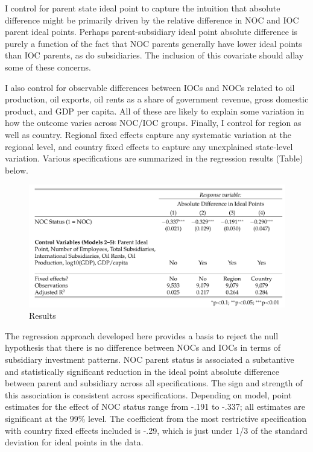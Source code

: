 \documentclass[11pt,]{book}
\begin{document}
I control for parent state ideal point to capture the intuition that absolute difference might be primarily driven by the relative difference in NOC and IOC parent ideal points. Perhaps parent-subsidiary ideal point absolute difference is purely a function of the fact that NOC parents generally have lower ideal points than IOC parents, as do subsidiaries. The inclusion of this covariate should allay some of these concerns.

I also control for observable differences between IOCs and NOCs related to oil production, oil exports, oil rents as a share of government revenue, gross domestic product, and GDP per capita. All of these are likely to explain some variation in how the outcome varies across NOC/IOC groups. Finally, I control for region as well as country. Regional fixed effects capture any systematic variation at the regional level, and country fixed effects to capture any unexplained state-level variation. Various specifications are summarized in the regression results (Table) below.

\begin{figure}

{\centering \includegraphics[width=1\linewidth]{fig/reg_results_01} 

}

\caption{Results}\label{fig:regress}
\end{figure}

The regression approach developed here provides a basis to reject the null hypothesis that there is no difference between NOCs and IOCs in terms of subsidiary investment patterns. NOC parent status is associated a substantive and statistically significant reduction in the ideal point absolute difference between parent and subsidiary across all specifications. The sign and strength of this association is consistent across specifications. Depending on model, point estimates for the effect of NOC status range from -.191 to -.337; all estimates are significant at the 99\% level. The coefficient from the most restrictive specification with country fixed effects included is -.29, which is just under 1/3 of the standard deviation for ideal points in the data.
\end{document}
